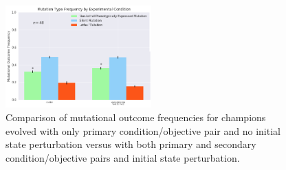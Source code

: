 \begin{figure}
    \centering
    \includegraphics[width=0.5\textwidth]{img/mutation_type_combined}
  	\caption{Comparison of mutational outcome frequencies for champions evolved with only primary condition/objective pair and no initial state perturbation versus with both primary and secondary condition/objective pairs and initial state perturbation.}
    \label{fig:mutation_type_combined}
\end{figure}
